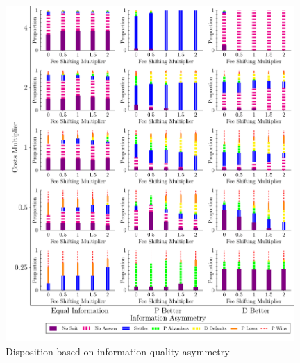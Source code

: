 \documentclass{article}
\begin{document}
\begin{figure}
    \centering
    \begin{minipage}{0.48\textwidth}
        \centering
        \includegraphics[width=0.98\textwidth, scale=0.70, trim={0in 0in 0in 0in}, clip]{../Figures/Disposition Varying Information Asymmetry} %
        \caption{Disposition based on information quality asymmetry}
		\label{fig:dispositions_playernoise_asymmetry}
    \end{minipage}\hfill
    \begin{minipage}{0.48\textwidth}
        \centering

\end{minipage}
\end{figure}
\end{document}
